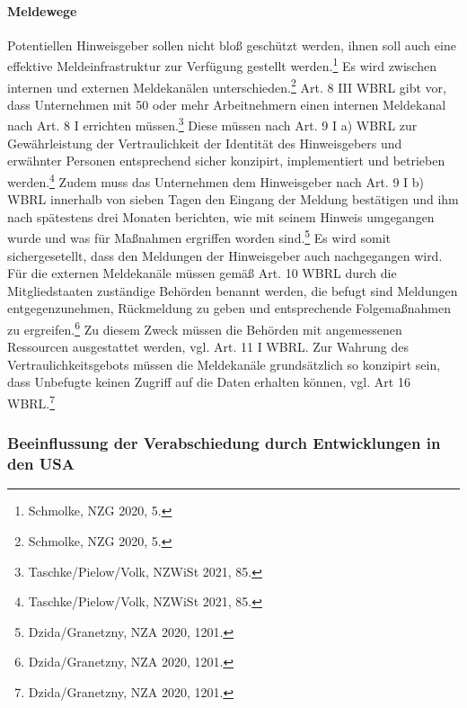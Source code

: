 \paragraph{Meldewege}
Potentiellen Hinweisgeber sollen nicht bloß geschützt werden, ihnen soll auch eine effektive Meldeinfrastruktur zur Verfügung gestellt werden.\footnote{Schmolke, NZG 2020, 5.}
Es wird zwischen internen und externen Meldekanälen unterschieden.\footnote{Schmolke, NZG 2020, 5.}
Art. 8 III WBRL gibt vor, dass Unternehmen mit 50 oder mehr Arbeitnehmern einen internen Meldekanal nach Art. 8 I errichten müssen.\footnote{Taschke/Pielow/Volk, NZWiSt 2021, 85.}
Diese müssen nach Art. 9 I a) WBRL zur Gewährleistung der Vertraulichkeit der Identität des Hinweisgebers und erwähnter Personen entsprechend sicher konzipirt, implementiert und betrieben werden.\footnote{Taschke/Pielow/Volk, NZWiSt 2021, 85.}
Zudem muss das Unternehmen dem Hinweisgeber nach Art. 9 I b) WBRL innerhalb von sieben Tagen den Eingang der Meldung bestätigen und ihm nach spätestens drei Monaten berichten, wie mit seinem Hinweis umgegangen wurde und was für Maßnahmen ergriffen worden sind.\footnote{Dzida/Granetzny, NZA 2020, 1201.}
Es wird somit sichergesetellt, dass den Meldungen der Hinweisgeber auch nachgegangen wird.\\
Für die externen Meldekanäle müssen gemäß Art. 10 WBRL durch die Mitgliedstaaten zuständige Behörden benannt werden, die befugt sind Meldungen entgegenzunehmen, Rückmeldung zu geben und entsprechende Folgemaßnahmen zu ergreifen.\footnote{Dzida/Granetzny, NZA 2020, 1201.}
Zu diesem Zweck müssen die Behörden mit angemessenen Ressourcen ausgestattet werden, vgl. Art. 11 I WBRL.
Zur Wahrung des Vertraulichkeitsgebots müssen die Meldekanäle grundsätzlich so konzipirt sein, dass Unbefugte keinen Zugriff auf die Daten erhalten können, vgl. Art 16 WBRL.\footnote{Dzida/Granetzny, NZA 2020, 1201.}



\subsubsection{Beeinflussung der Verabschiedung durch Entwicklungen in den USA}

